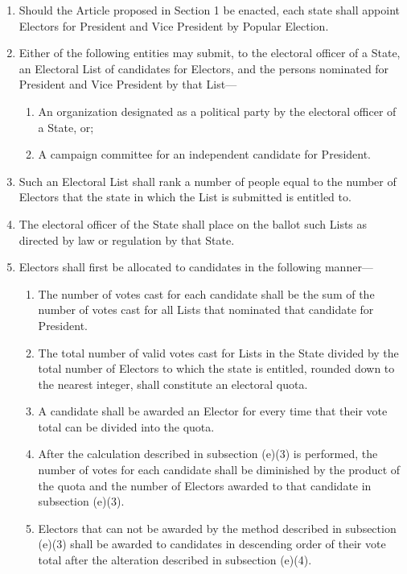 \documentclass{article}
\begin{document}
    \begin{enumerate}
        \item Should the Article proposed in Section 1 be enacted, each state shall appoint Electors for President and Vice President by Popular Election. 
        \item Either of the following entities may submit, to the electoral officer of a State, an Electoral List of candidates for Electors, and the persons nominated for President and Vice President by that List---
        \begin{enumerate}
            \item An organization designated as a political party by the electoral officer of a State, or;
            \item A campaign committee for an independent candidate for President.
        \end{enumerate}
        \item Such an Electoral List shall rank a number of people equal to the number of Electors that the state in which the List is submitted is entitled to. 
        \item The electoral officer of the State shall place on the ballot such Lists as directed by law or regulation by that State. 
        \item Electors shall first be allocated to candidates in the following manner---
        \begin{enumerate}
            \item The number of votes cast for each candidate shall be the sum of the number of votes cast for all Lists that nominated that candidate for President.
            \item The total number of valid votes cast for Lists in the State divided by the total number of Electors to which the state is entitled, rounded down to the nearest integer, shall constitute an electoral quota.
            \item A candidate shall be awarded an Elector for every time that their vote total can be divided into the quota.
            \item After the calculation described in subsection (e)(3) is performed, the number of votes for each candidate shall be diminished by the product of the quota and the number of Electors awarded to that candidate in subsection (e)(3).
            \item Electors that can not be awarded by the method described in subsection (e)(3) shall be awarded to candidates in descending order of their vote total after the alteration described in subsection (e)(4).

\end{enumerate}
\end{enumerate}
\end{document}
